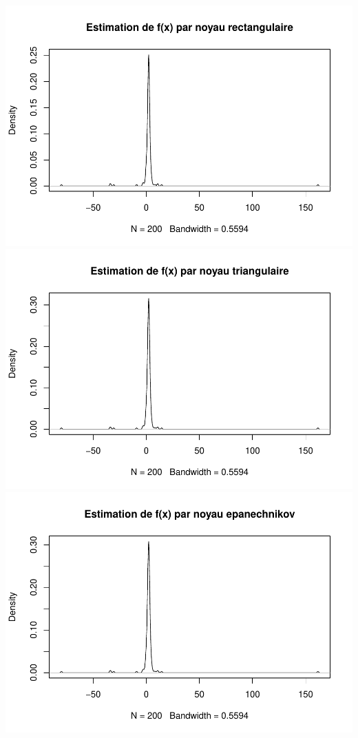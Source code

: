 \documentclass[
]{article}
\begin{document}
\includegraphics{DM_files/figure-latex/unnamed-chunk-2-3.pdf}
\includegraphics{DM_files/figure-latex/unnamed-chunk-2-4.pdf}
\includegraphics{DM_files/figure-latex/unnamed-chunk-2-5.pdf}
\end{document}
